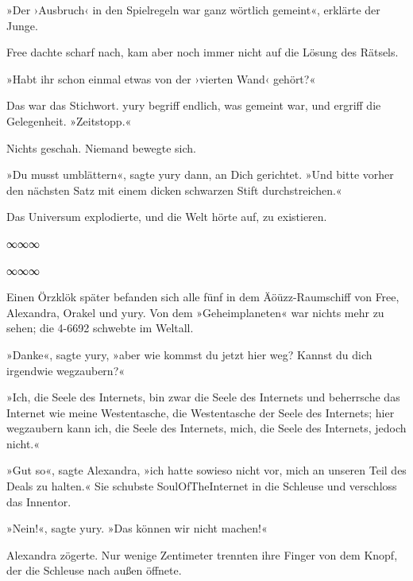 »Der ›Ausbruch‹ in den Spielregeln war ganz wörtlich gemeint«, erklärte der Junge.

Free dachte scharf nach, kam aber noch immer nicht auf die Lösung des Rätsels.

»Habt ihr schon einmal etwas von der ›vierten Wand‹ gehört?«

Das war das Stichwort. yury begriff endlich, was gemeint war, und ergriff die Gelegenheit. »Zeitstopp.«

Nichts geschah. Niemand bewegte sich.

»Du musst umblättern«, sagte yury dann, an Dich gerichtet. »Und bitte vorher den nächsten Satz mit einem dicken schwarzen Stift durchstreichen.«

Das Universum explodierte, und die Welt hörte auf, zu existieren.

\begin{center}
    ∞∞∞
\end{center}

\cleardoubleevenplainpage
\cleardoubleoddplainpage
\cleardoubleevenplainpage

\begin{center}
    ∞∞∞
\end{center}

Einen Örzklök später befanden sich alle fünf in dem Äöüzz-Raumschiff von Free, Alexandra, Orakel und yury. Von dem »Geheimplaneten« war nichts mehr zu sehen; die 4-6692 schwebte im Weltall.

»Danke«, sagte yury, »aber wie kommst du jetzt hier weg? Kannst du dich irgendwie wegzaubern?«

»Ich, die Seele des Internets, bin zwar die Seele des Internets und beherrsche das Internet wie meine Westentasche, die Westentasche der Seele des Internets; hier wegzaubern kann ich, die Seele des Internets, mich, die Seele des Internets, jedoch nicht.«

»Gut so«, sagte Alexandra, »ich hatte sowieso nicht vor, mich an unseren Teil des Deals zu halten.« Sie schubste SoulOfTheInternet in die Schleuse und verschloss das Innentor.

»Nein!«, sagte yury. »Das können wir nicht machen!«

Alexandra zögerte. Nur wenige Zentimeter trennten ihre Finger von dem Knopf, der die Schleuse nach außen öffnete.

